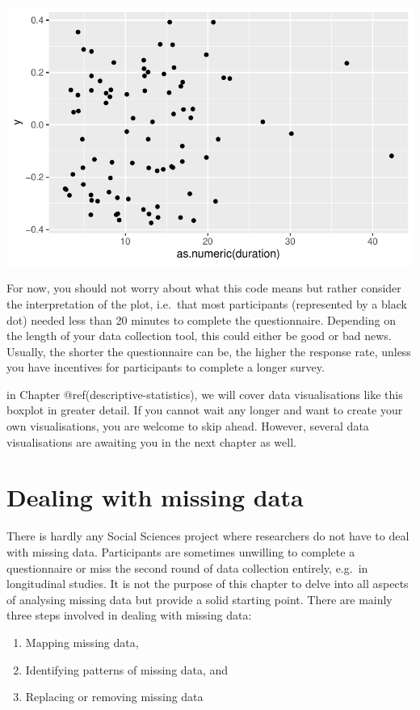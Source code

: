 \documentclass[
  letterpaper,
]{krantz}
\begin{document}
\includegraphics{07_data_wrangling_files/figure-pdf/duration-boxplot-1.pdf}

For now, you should not worry about what this code means but rather
consider the interpretation of the plot, i.e.~that most participants
(represented by a black dot) needed less than 20 minutes to complete the
questionnaire. Depending on the length of your data collection tool,
this could either be good or bad news. Usually, the shorter the
questionnaire can be, the higher the response rate, unless you have
incentives for participants to complete a longer survey.

in Chapter @ref(descriptive-statistics), we will cover data
visualisations like this boxplot in greater detail. If you cannot wait
any longer and want to create your own visualisations, you are welcome
to skip ahead. However, several data visualisations are awaiting you in
the next chapter as well.

\section{Dealing with missing data}\label{sec-dealing-with-missing-data}

There is hardly any Social Sciences project where researchers do not
have to deal with missing data. Participants are sometimes unwilling to
complete a questionnaire or miss the second round of data collection
entirely, e.g.~in longitudinal studies. It is not the purpose of this
chapter to delve into all aspects of analysing missing data but provide
a solid starting point. There are mainly three steps involved in dealing
with missing data:

\begin{enumerate}
\def\labelenumi{\arabic{enumi}.}
\item
  Mapping missing data,
\item
  Identifying patterns of missing data, and
\item
  Replacing or removing missing data
\end{enumerate}
\end{document}
